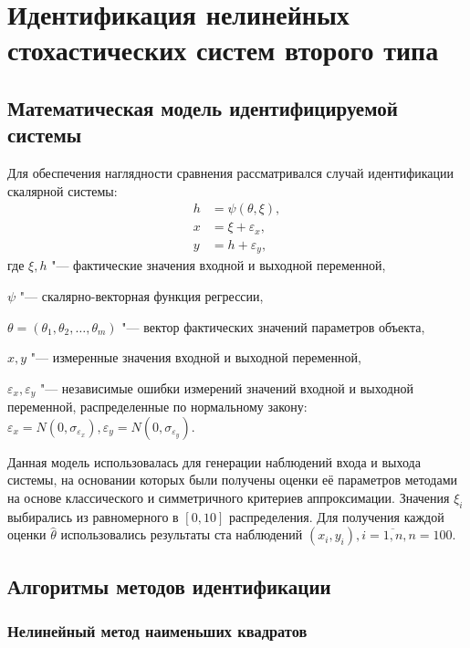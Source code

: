\chapter[Идентификация нелинейных стохастических систем второго типа]{%
  Идентификация нелинейных стохастических систем второго типа
}

\section{Математическая модель идентифицируемой системы}

Для обеспечения наглядности сравнения рассматривался случай идентификации скалярной системы:
\begin{equation}
  \label{eq:nonlinear_model_scalar}
  \begin{aligned}
  h &= \psi(\theta, \xi), \\
  x &= \xi + \varepsilon_x, \\
  y &= h + \varepsilon_y,
  \end{aligned}
\end{equation}
где \( \xi, h \) "--- фактические значения входной и выходной переменной, \par
\( \psi \) "--- скалярно-векторная функция регрессии, \par
\( \theta = (\theta_1, \theta_2, \dotsc, \theta_m) \) "--- вектор фактических значений параметров объекта, \par
\( x, y \) "--- измеренные значения входной и выходной переменной, \par
\( \varepsilon_x, \varepsilon_y \) "--- независимые ошибки измерений значений входной и
выходной переменной, распределенные по нормальному закону:
\(
\varepsilon_x = N(0, \sigma_{\varepsilon_x}),
\varepsilon_y = N(0, \sigma_{\varepsilon_y})
\).

Данная модель использовалась для генерации наблюдений входа и выхода системы,
на основании которых были получены оценки её параметров методами на основе
классического и симметричного критериев аппроксимации.
Значения \( \xi_i \) выбирались из равномерного в \( [0, 10] \) распределения.
Для получения каждой оценки \( \hat{\theta} \) использовались результаты
ста наблюдений \( ( x_i, y_i ), i = \overline{1, n}, n = 100 \).

\section{Алгоритмы методов идентификации}

\subsection{Нелинейный метод наименьших квадратов}

